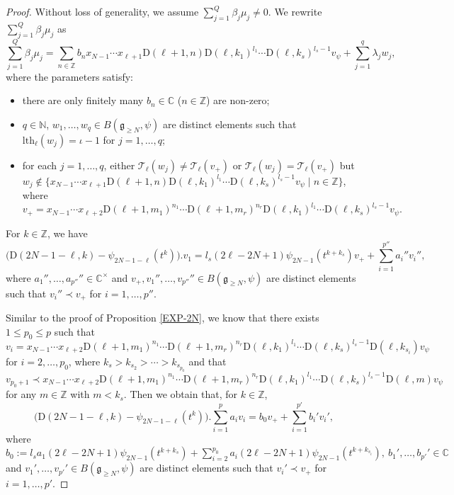 \documentclass[12pt, a4paper]{amsart}
\newcommand{\fg}{\mathfrak g}
\newcommand{\C}{\mathbb{C}}
\newcommand{\N}{\mathbb N}
\newcommand{\Z}{\mathbb Z}
\newcommand{\rD}{\mathrm{D}}
\theoremstyle{Theorem}
\theoremstyle{Theorem}
\numberwithin{equation}{section}
\begin{document}
\begin{proof}
Without loss of generality, we assume $\sum_{j=1}^{Q}\beta_{j}\mu_{j}\neq0$.
We rewrite $\sum_{j=1}^{Q}\beta_{j}\mu_{j}$ as
\[\sum_{j=1}^{Q}\beta_{j}\mu_{j}=\sum_{n\in\Z}b_{n}x_{N-1}\cdots x_{\ell+1}\rD(\ell+1,n)\rD(\ell,k_{1})^{l_{1}}\cdots\rD(\ell,k_{s})^{l_{s}-1}v_{\psi}+\sum_{j=1}^{q}\lambda_{j}w_{j},\]
where the parameters satisfy:
\begin{itemize}
\item[(c1)] there are only finitely many $b_{n}\in\C$ ($n\in\Z$) are non-zero;
\item[(c2)] $q\in\N$, $w_{1},\dots,w_{q}\in B(\fg_{\geq N},\psi)$ are distinct elements such that
$\mathrm{lth}_{\ell}(w_{j})=\iota-1$ for $j=1,\dots,q$;
\item[(c3)] for each $j=1,\dots,q$, either $\mathcal{T}_{\ell}(w_{j})\neq \mathcal{T}_{\ell}(v_{+})$ or
$\mathcal{T}_{\ell}(w_{j})=\mathcal{T}_{\ell}(v_{+})$ but $w_{j}\not\in\{x_{N-1}\cdots x_{\ell+1}\rD(\ell+1,n)\rD(\ell,k_{1})^{l_{1}}\cdots\rD(\ell,k_{s})^{l_{s}-1}v_{\psi}\mid n\in\Z\}$,
where \[v_{+}=x_{N-1}\cdots x_{\ell+2}\rD(\ell+1,m_{1})^{n_{1}}\cdots\rD(\ell+1,m_{r})^{n_{r}}
\rD(\ell,k_{1})^{l_{1}}\cdots\rD(\ell,k_{s})^{l_{s}-1}v_{\psi}.\]
\end{itemize}

\vspace{2mm}

For $k\in\Z$, we have
$$\big(\rD(2N-1-\ell,k)-\psi_{2N-1-\ell}(t^{k})\big).v_{1}=l_{s}(2\ell-2N+1)
\psi_{2N-1}(t^{k+k_{s}})v_{+}+\sum_{i=1}^{p''}a_{i}''v_{i}'',$$
where $a_{1}'',\dots,a_{p''}''\in\C^{\times}$ and $v_{+},v_{1}'',\dots,v_{p''}''\in B(\fg_{\geq N},\psi)$
are distinct elements such that $v_{i}''\prec v_{+}$ for $i=1,\dots,p''$.


\vspace{2mm}
Similar to the proof of Proposition \ref{EXP-2N}, we know that there exists $1\leq p_{0}\leq p$ such that
\[v_{i}=x_{N-1}\cdots x_{\ell+2}\rD(\ell+1,m_{1})^{n_{1}}\cdots\rD(\ell+1,m_{r})^{n_{r}}
\rD(\ell,k_{1})^{l_{1}}\cdots\rD(\ell,k_{s})^{l_{s}-1}\rD(\ell,k_{s_{i}})v_{\psi}\]
for $i=2,\dots,p_{0}$, where $k_{s}>k_{s_{2}}>\cdots>k_{s_{p_{0}}}$ and that
\[v_{p_{0}+1}\prec x_{N-1}\cdots x_{\ell+2}\rD(\ell+1,m_{1})^{n_{1}}\cdots\rD(\ell+1,m_{r})^{n_{r}}
\rD(\ell,k_{1})^{l_{1}}\cdots\rD(\ell,k_{s})^{l_{s}-1}\rD(\ell,m)v_{\psi}\]
for any $m\in\Z$ with $m<k_{s}$. Then we obtain that, for $k\in\Z$,
$$\big(\rD(2N-1-\ell,k)-\psi_{2N-1-\ell}(t^{k})\big).\sum_{i=1}^{p}a_{i}v_{i}=b_{0}v_{+}+\sum_{i=1}^{p'}b_{i}'v_{i}',$$
where $b_{0}:=l_{s}a_{1}(2\ell-2N+1)\psi_{2N-1}(t^{k+k_{s}})+\sum_{i=2}^{p_{0}}a_{i}(2\ell-2N+1)\psi_{2N-1}(t^{k+k_{s_{i}}}),\
b_{1}',\dots,b_{p'}'\in\C$ and $v_{1}',\dots,v_{p'}'\in B(\fg_{\geq N},\psi)$ are distinct elements such that
$v_{i}'\prec v_{+}$ for $i=1,\dots,p'$.


\end{proof}
\end{document}
